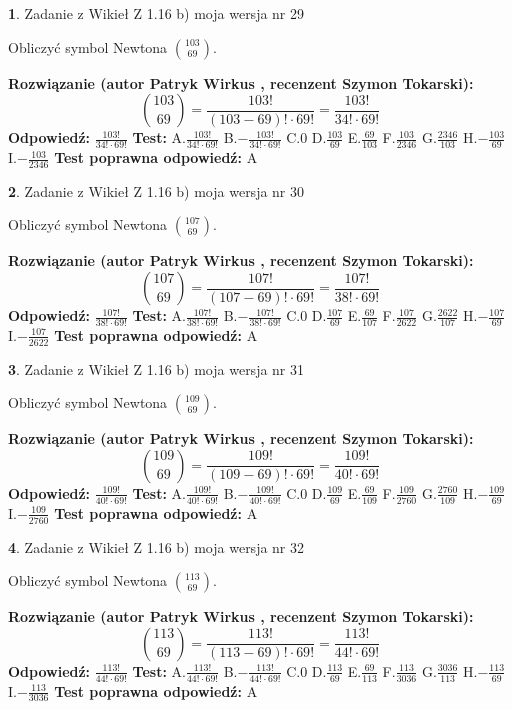 \documentclass[12pt, a4paper]{article}
\theoremstyle{definition} %
\newtheorem{zad}{}
\newcommand{\zadStart}[1]{\begin{zad}#1\newline}
\newcommand{\zadStop}{\end{zad}}
\newcommand{\rozwStart}[2]{\noindent \textbf{Rozwiązanie (autor #1 , recenzent #2): }\newline}
\newcommand{\rozwStop}{\newline}
\newcommand{\odpStart}{\noindent \textbf{Odpowiedź:}\newline}
\newcommand{\odpStop}{\newline}
\newcommand{\testStart}{\noindent \textbf{Test:}\newline}
\newcommand{\testStop}{\newline}
\newcommand{\kluczStart}{\noindent \textbf{Test poprawna odpowiedź:}\newline}
\newcommand{\kluczStop}{\newline}
\begin{document}
\zadStart{Zadanie z Wikieł Z 1.16 b) moja wersja nr 29}

Obliczyć symbol Newtona ${103 \choose 69}$.
\zadStop
\rozwStart{Patryk Wirkus}{Szymon Tokarski}
$${103 \choose 69} = \frac{103!}{(103-69)! \cdot 69!} = \frac{103!}{34! \cdot 69!}$$
\rozwStop
\odpStart
$\frac{103!}{34! \cdot 69!}$
\odpStop
\testStart
A.$\frac{103!}{34! \cdot 69!}$ B.$-\frac{103!}{34! \cdot 69!}$ C.$0$ D.$\frac{103}{69}$ E.$\frac{69}{103}$
F.$\frac{103}{2346}$ G.$\frac{2346}{103}$
H.$-\frac{103}{69}$
I.$-\frac{103}{2346}$
\testStop
\kluczStart
A
\kluczStop



\zadStart{Zadanie z Wikieł Z 1.16 b) moja wersja nr 30}

Obliczyć symbol Newtona ${107 \choose 69}$.
\zadStop
\rozwStart{Patryk Wirkus}{Szymon Tokarski}
$${107 \choose 69} = \frac{107!}{(107-69)! \cdot 69!} = \frac{107!}{38! \cdot 69!}$$
\rozwStop
\odpStart
$\frac{107!}{38! \cdot 69!}$
\odpStop
\testStart
A.$\frac{107!}{38! \cdot 69!}$ B.$-\frac{107!}{38! \cdot 69!}$ C.$0$ D.$\frac{107}{69}$ E.$\frac{69}{107}$
F.$\frac{107}{2622}$ G.$\frac{2622}{107}$
H.$-\frac{107}{69}$
I.$-\frac{107}{2622}$
\testStop
\kluczStart
A
\kluczStop



\zadStart{Zadanie z Wikieł Z 1.16 b) moja wersja nr 31}

Obliczyć symbol Newtona ${109 \choose 69}$.
\zadStop
\rozwStart{Patryk Wirkus}{Szymon Tokarski}
$${109 \choose 69} = \frac{109!}{(109-69)! \cdot 69!} = \frac{109!}{40! \cdot 69!}$$
\rozwStop
\odpStart
$\frac{109!}{40! \cdot 69!}$
\odpStop
\testStart
A.$\frac{109!}{40! \cdot 69!}$ B.$-\frac{109!}{40! \cdot 69!}$ C.$0$ D.$\frac{109}{69}$ E.$\frac{69}{109}$
F.$\frac{109}{2760}$ G.$\frac{2760}{109}$
H.$-\frac{109}{69}$
I.$-\frac{109}{2760}$
\testStop
\kluczStart
A
\kluczStop



\zadStart{Zadanie z Wikieł Z 1.16 b) moja wersja nr 32}

Obliczyć symbol Newtona ${113 \choose 69}$.
\zadStop
\rozwStart{Patryk Wirkus}{Szymon Tokarski}
$${113 \choose 69} = \frac{113!}{(113-69)! \cdot 69!} = \frac{113!}{44! \cdot 69!}$$
\rozwStop
\odpStart
$\frac{113!}{44! \cdot 69!}$
\odpStop
\testStart
A.$\frac{113!}{44! \cdot 69!}$ B.$-\frac{113!}{44! \cdot 69!}$ C.$0$ D.$\frac{113}{69}$ E.$\frac{69}{113}$
F.$\frac{113}{3036}$ G.$\frac{3036}{113}$
H.$-\frac{113}{69}$
I.$-\frac{113}{3036}$
\testStop
\kluczStart
A
\kluczStop
\end{document}
